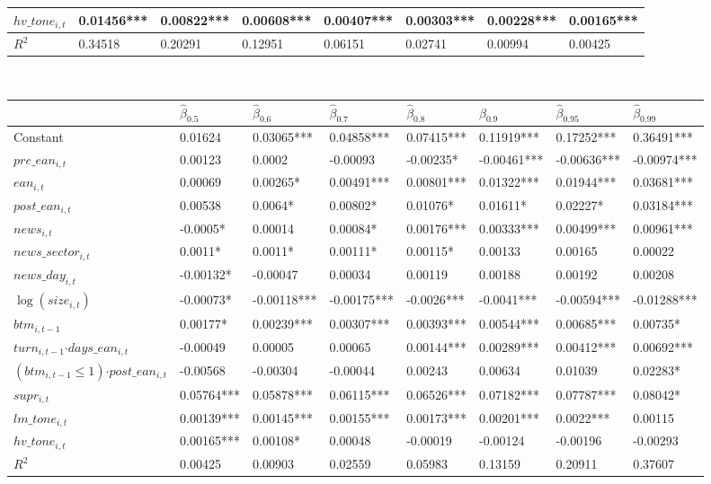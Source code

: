 \documentclass[11pt]{article}
\begin{document}
\begin{small}
\begin{table}
\begin{tabular}[t]{l|l|l|l|l|l|l|l}
\hline
$hv\_tone_{i,t}$  & 0.01456*** & 0.00822*** & 0.00608*** & 0.00407*** & 0.00303*** & 0.00228*** & 0.00165***\\
\hline
$R^2$ & 0.34518 & 0.20291 & 0.12951 & 0.06151 & 0.02741 & 0.00994 & 0.00425\\
\hline
\end{tabular}
\\
\centering
\begin{tabular}[t]{l|l|l|l|l|l|l|l}
\hline
  & $\hat\beta_{0.5}$ & $\hat\beta_{0.6}$ & $\hat\beta_{0.7}$ & $\hat\beta_{0.8}$ & $\hat\beta_{0.9}$ & $\hat\beta_{0.95}$ & $\hat\beta_{0.99}$\\
\hline
Constant & 0.01624 & 0.03065*** & 0.04858*** & 0.07415*** & 0.11919*** & 0.17252*** & 0.36491***\\
\hline
$pre\_ean_{i,t}$ & 0.00123 & 0.0002 & -0.00093 & -0.00235* & -0.00461*** & -0.00636*** & -0.00974***\\
\hline
$ean_{i,t}$ & 0.00069 & 0.00265* & 0.00491*** & 0.00801*** & 0.01322*** & 0.01944*** & 0.03681***\\
\hline
$post\_ean_{i,t}$ & 0.00538 & 0.0064* & 0.00802* & 0.01076* & 0.01611* & 0.02227* & 0.03184***\\
\hline
$news_{i,t}$ & -0.0005* & 0.00014 & 0.00084* & 0.00176*** & 0.00333*** & 0.00499*** & 0.00961***\\
\hline
$news\_sector_{i,t}$ & 0.0011* & 0.0011* & 0.00111* & 0.00115* & 0.00133 & 0.00165 & 0.00022\\
\hline
$news\_day_{i,t}$ & -0.00132* & -0.00047 & 0.00034 & 0.00119 & 0.00188 & 0.00192 & 0.00208\\
\hline
$\log(size_{i,t})$& -0.00073* & -0.00118*** & -0.00175*** & -0.0026*** & -0.0041*** & -0.00594*** & -0.01288***\\
\hline
$btm_{i,t-1}$ & 0.00177* & 0.00239*** & 0.00307*** & 0.00393*** & 0.00544*** & 0.00685*** & 0.00735*\\
\hline
$turn_{i,t-1}$$\cdot days\_ean_{i,t}$ & -0.00049 & 0.00005 & 0.00065 & 0.00144*** & 0.00289*** & 0.00412*** & 0.00692***\\
\hline
$(btm_{i,t-1}\leq 1)$$\cdot post\_ean_{i,t}$ & -0.00568 & -0.00304 & -0.00044 & 0.00243 & 0.00634 & 0.01039 & 0.02283*\\
\hline
$supr_{i,t}$ & 0.05764*** & 0.05878*** & 0.06115*** & 0.06526*** & 0.07182*** & 0.07787*** & 0.08042*\\
\hline
$lm\_tone_{i,t}$ & 0.00139*** & 0.00145*** & 0.00155*** & 0.00173*** & 0.00201*** & 0.0022*** & 0.00115\\
\hline
$hv\_tone_{i,t}$ & 0.00165*** & 0.00108* & 0.00048 & -0.00019 & -0.00124 & -0.00196 & -0.00293\\
\hline
$R^2$ & 0.00425 & 0.00903 & 0.02559 & 0.05983 & 0.13159 & 0.20911 & 0.37607\\
\hline
\end{tabular}
\end{table}
\end{small}
\end{document}
